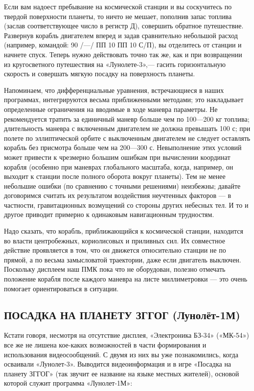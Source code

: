 \documentclass[11pt,a4paper,oneside]{article}
\begin{document}
Если вам надоест пребывание на космической станции и вы соскучитесь по твердой поверхности планеты, то ничто не мешает, пополнив запас топлива (заслав соответствующее число в регистр Д), совершить обратное путешествие. Развернув корабль двигателем вперед и задав сравнительно небольшой расход (например, командой: 90 /—/ ПП 10 ПП 10 С/П), вы отделитесь от станции и начнете спуск. Теперь нужно действовать точно так же, как и при возвращении из кругосветного путешествия на «Лунолете-3»,— гасить горизонтальную скорость и совершать мягкую посадку на поверхность планеты.

Напоминаем, что дифференциальные уравнения, встречающиеся в наших программах, интегрируются весьма приближенными методами; это накладывает определенные ограничения на вводимые в ходе маневра параметры. Не рекомендуется тратить за единичный маневр больше чем по 100—200 кг топлива; длительность маневра с включенным двигателем не должна превышать 100 с; при полете по эллиптической орбите с выключенным двигателем не следует оставлять корабль без присмотра больше чем на 200—300 с. Невыполнение этих условий может привести к чрезмерно большим ошибкам при вычислении координат корабля (особенно при маневрах глобального масштаба, когда, например, он выходит к станции после полного оборота вокруг планеты). Тем не менее небольшие ошибки (по сравнению с точными решениями) неизбежны; давайте договоримся считать их результатом воздействия неучтенных факторов — в частности, гравитационных возмущений со стороны других небесных тел. И то и другое приводит примерно к одинаковым навигационным трудностям.

Надо сказать, что корабль, приближающийся к космической станции, находится во власти центробежных, кориолисовых и приливных сил. Их совместное действие проявляется в том, что он движется относительно станции не по прямой, а по весьма замысловатой траектории, даже если двигатель выключен. Поскольку дисплеем наш ПМК пока что не оборудован, полезно отмечать положение корабля после каждого маневра на листе миллиметровки — это очень помогает ориентироваться в ситуации.

\subsection{ПОСАДКА НА ПЛАНЕТУ ЗГГОГ (Лунолёт-1М)}
Кстати говоря, несмотря на отсутствие дисплея, «Электроника БЗ-34» («МК-54») все же не лишена кое-каких возможностей в части формирования и использования видеосообщений. С двумя из них вы уже познакомились, когда осваивали «Лунолет-3». Выводится видеоинформация и в игре «Посадка на планету ЗГГОГ» (так звучит ее название на языке местных жителей), основой которой служит программа «Лунолет-1М»:
\end{document}
